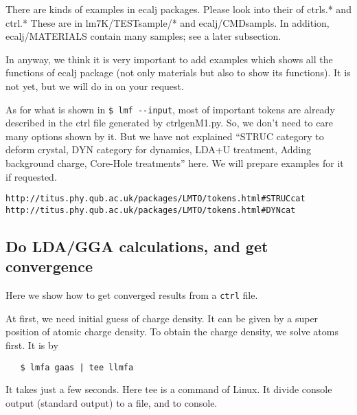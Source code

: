 \documentclass[a4paper,10pt,epsf,fleqn]{article}
\begin{document}
There are kinds of examples in ecalj packages.
Please look into their of ctrls.* and ctrl.*
These are in lm7K/TESTsample/* and ecalj/CMDsampls. 
In addition, ecalj/MATERIALS contain many samples; see a later subsection. 

In anyway, we think it is very important to add examples which shows all
the functions of ecalj package (not only materials but also to show its
functions). It is not yet, but we will do in on your request.

As for what is shown in \verb+$ lmf --input+, most of important tokens are
already described in the ctrl file generated by ctrlgenM1.py.
So, we don't need to care many options shown by it.
But we have not explained 
``STRUC category to deform crystal, DYN category for dynamics, LDA+U
treatment, Adding background charge, Core-Hole treatments'' here. 
We will prepare examples for it if requested.
\begin{verbatim}
http://titus.phy.qub.ac.uk/packages/LMTO/tokens.html#STRUCcat
http://titus.phy.qub.ac.uk/packages/LMTO/tokens.html#DYNcat
\end{verbatim}

\subsection{Do LDA/GGA calculations, and get convergence}
\label{lm7K-scf}
Here we show how to get converged results from a \verb+ctrl+ file.

At first, we need initial guess of charge density.
It can be given by a super position of atomic charge density.
To obtain the charge density, we solve atoms first. It is by
\begin{verbatim}
   $ lmfa gaas | tee llmfa
\end{verbatim}
It takes just a few seconds. Here tee is a command of Linux.
It divide console output (standard output) to a file, and to console.
\end{document}
